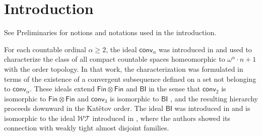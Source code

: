 \documentclass{amsart}
\theoremstyle{plain}
\theoremstyle{definition}
\theoremstyle{remark}
\newcommand{\FIN}{\mathsf{Fin}}
\newcommand{\finxfin}{\FIN\otimes\FIN}
\newcommand{\conv}{\mathsf{conv}}
\newcommand{\BI}{\mathsf{BI}}
\begin{document}

\begin{abstract}
For each countable ordinal $\alpha \ge 2$, the ideals $\conv_\alpha$ were introduced in 
\emph{Critical ideals for countable compact spaces} (to appear in Fund. Math., see also  
arXiv:2503.12571)
to characterize compact countable spaces homeomorphic to $\omega^\alpha \cdot n+1$ with the order topology. We study the structure of these ideals in the Kat\v{e}tov order, namely for limit ordinals $\alpha$, we show that  $\conv_{\alpha}$ do not serve as greatest lower bounds of the $\conv_\beta$ for $\beta<\alpha$. We therefore define the ideals $\conv_{<\alpha}$ with this property and show that together, the ideals $\conv_\alpha$ and $\conv_{<\alpha}$ form intertwined decreasing hierarchies of $\Sigma^0_4$- and $\Pi^0_5$-complete ideals. Furthermore, we examine several cardinal invariants of $\conv_\alpha$, computing invariants that have recently appeared in the literature in various contexts.



\end{abstract}




\maketitle




\section{Introduction}\label{sec:intro}


See Preliminaries for notions and notations used in the introduction.

For each countable ordinal $\alpha\geq 2$, the ideal $\conv_\alpha$ was introduced in \cite{critical-ideals-RF-MK-AK} and used to characterize the class of all compact countable spaces homeomorphic to $\omega^\alpha \cdot n+1$ with the order topology. In that work, the characterization was formulated in terms of the existence of a convergent subsequence defined on a set not belonging to $\conv_\alpha$. 
These ideals extend $\finxfin$ and $\BI$ in the sense that $\conv_2$ is isomorphic to $\finxfin$ and $\conv_3$ is isomorphic to $\BI$ , and the resulting hierarchy proceeds downward in the Kat\v{e}tov order. The ideal $\BI$ was introduced in \cite{MR4584767} and is isomorphic to the ideal $\mathcal{WT}$ introduced in \cite{BRENDLE-CJM-2025}, where the authors showed its connection with weakly tight almost disjoint families.
\end{document}
